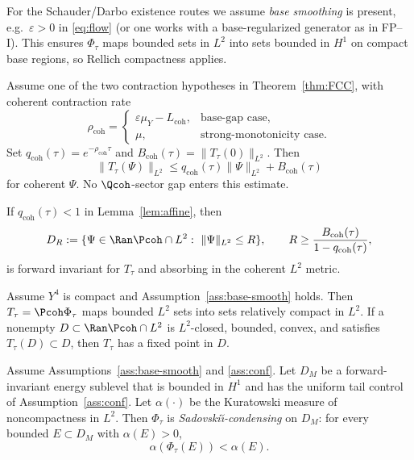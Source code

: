 \documentclass[11pt]{article}
\newcommand{\Yfour}{\ensuremath{Y^{4}}}
\newcommand{\Ltwo}{\ensuremath{L^{2}}}
\newcommand{\Lcoh}{L_{\mathrm{coh}}}
\begin{document}
\begin{assumption}\label{ass:base-smooth}
For the Schauder/Darbo existence routes we assume \emph{base smoothing} is present, e.g.\
$\varepsilon>0$ in \eqref{eq:flow} (or one works with a base-regularized generator as in FP--I).
This ensures $\Phi_\tau$ maps bounded sets in $\Ltwo$ into sets bounded in $H^1$ on compact base regions,
so Rellich compactness applies.
\end{assumption}

\begin{lemma}\label{lem:affine}
Assume one of the two contraction hypotheses in Theorem~\ref{thm:FCC}, with
coherent contraction rate
\[
\rho_{\mathrm{coh}}=
\begin{cases}
\varepsilon\mu_Y-\Lcoh,&\text{base-gap case},\\
\mu,&\text{strong-monotonicity case}.
\end{cases}
\]
Set $q_{\mathrm{coh}}(\tau)=e^{-\rho_{\mathrm{coh}}\tau}$ and
$B_{\mathrm{coh}}(\tau)=\|T_\tau(0)\|_{\Ltwo}$. Then
\[
\|T_\tau(\Psi)\|_{\Ltwo}
\le q_{\mathrm{coh}}(\tau)\|\Psi\|_{\Ltwo}+B_{\mathrm{coh}}(\tau)
\]
for coherent $\Psi$. No $\Qcoh$-sector gap enters this estimate.
\end{lemma}

\begin{corollary}\label{cor:ball}
If $q_{\mathrm{coh}}(\tau)<1$ in Lemma~\ref{lem:affine}, then
\[
D_R := \{\Psi\in \Ran\Pcoh\cap \Ltwo:\ \|\Psi\|_{\Ltwo}\le R\},
\qquad
R\ge \frac{B_{\mathrm{coh}}(\tau)}{1-q_{\mathrm{coh}}(\tau)},
\]
is forward invariant for $T_\tau$ and absorbing in the coherent $\Ltwo$ metric.
\end{corollary}

\begin{corollary}\label{thm:schauder}
Assume $\Yfour$ is compact and Assumption~\ref{ass:base-smooth} holds. Then
$T_\tau=\Pcoh\Phi_\tau$ maps bounded $L^2$ sets into sets relatively compact
in $L^2$. If a nonempty $D\subset\Ran\Pcoh\cap\Ltwo$ is $L^2$-closed,
bounded, convex, and satisfies $T_\tau(D)\subset D$, then $T_\tau$ has a fixed
point in $D$.
\end{corollary}

\begin{lemma}\label{lem:condensing}
Assume Assumptions~\ref{ass:base-smooth} and \ref{ass:conf}. Let
$D_M$ be a forward-invariant energy sublevel that is bounded in $H^1$ and has
the uniform tail control of Assumption~\ref{ass:conf}. Let $\alpha(\cdot)$ be
the Kuratowski measure of noncompactness in $\Ltwo$. Then $\Phi_\tau$ is
\emph{Sadovski\u{\i}-condensing} on $D_M$: for every bounded
$E\subset D_M$ with $\alpha(E)>0$,
\[
\alpha(\Phi_\tau(E))<\alpha(E).
\]
\end{lemma}
\end{document}
